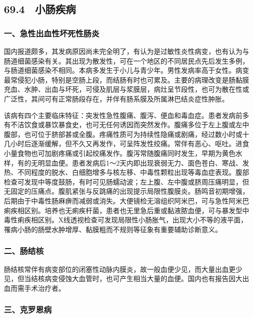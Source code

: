 \protect\hypertarget{text00177.html}{}{}

\subsection{69.4　小肠疾病}

\subsubsection{一、急性出血性坏死性肠炎}

国内报道颇多，其发病原因尚未完全明了，有认为是过敏性炎性病变，也有认为与肠道细菌感染有关。其出现为散发性，可在一个地区的不同居民点先后发生多例，与肠道细菌感染不相同。本病多发生于小儿与青少年。男性发病率高于女性。病变最常侵犯小肠，特别是空肠上段，而结肠有时也可累及。主要的病理改变是肠黏膜充血、水肿、出血与坏死，可侵及肌层与浆膜层，病灶呈节段性，也可为散在性或广泛性，其间可有正常肠段存在，并伴有肠系膜及所属淋巴结炎症性肿胀。

该病有四个主要临床特征：突发性急性腹痛、腹泻、便血和毒血症。患者发病前多有不洁饮食或暴饮暴食史，也可无任何诱因而突然发作。腹痛多位于左上腹或左中腹部，也可位于脐部甚或全腹。疼痛性质可为持续性隐痛或剧痛，经过数小时或十几小时后逐渐缓解，但不久又再发作，可呈阵发性绞痛。常伴有恶心、呕吐。进食小量食物也可加剧疼痛或引起绞痛发作。腹泻常随腹痛同时发生，早期为黄色水样，有的无明显血便。患者发病后1～2天内即出现衰弱无力、面色苍白、寒战、发热、不同程度的脱水、白细胞增多与核左移、中毒性颗粒出现等毒血症表现。腹部检查可发现中等度鼓肠，有时可见肠蠕动波；左上腹、左中腹或脐周压痛明显，但无固定的压痛点。腹肌紧张与反跳痛的出现提示局限性腹膜炎。肠鸣音初期增强，后期由于中毒性肠麻痹而减弱或消失。大便镜检无溶组织阿米巴，可与急性阿米巴痢疾相区别。培养也无痢疾杆菌，患者也无里急后重或黏液脓血便，可与暴发型中毒性痢疾相区别。X线透视检查可发现局限性小肠胀气，出现大小不等的液平面，罹病小肠的肠壁水肿增厚、黏膜粗而不规则等征象有重要辅助诊断意义。

\subsubsection{二、肠结核}

肠结核常伴有病变部位的闭塞性动脉内膜炎，故一般血便少见，而大量出血更少见，但当结核病变侵蚀大血管时，也可产生相当大量的血便。国内也有报告因大出血而需手术治疗者。

\subsubsection{三、克罗恩病}


